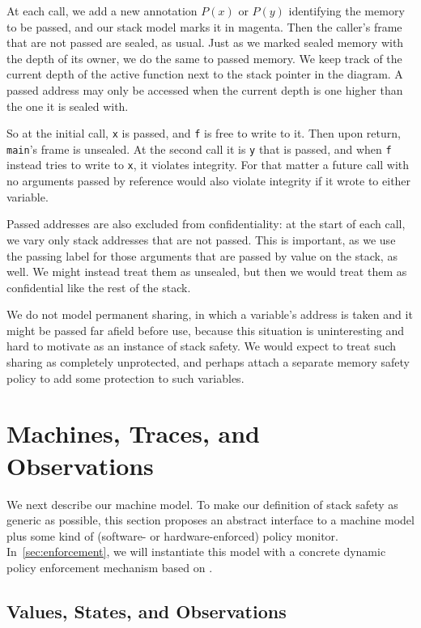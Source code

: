 \documentclass[acmsmall,review,anonymous]{acmart}\settopmatter{printfolios=true,printccs=false,printacmref=false}
\begin{document}
At each call, we add a new annotation \(P(x)\) or \(P(y)\) identifying the memory to be
passed, and our stack model marks it in magenta. Then the caller's frame that are not
passed are sealed, as usual. Just as we marked sealed memory with the depth of its owner,
we do the same to passed memory. We keep track of the current depth of the active function
next to the stack pointer in the diagram. A passed address may only be accessed when the
current depth is one higher than the one it is sealed with.

So at the initial call, {\tt x} is passed, and {\tt f} is free to write to it. Then upon
return, {\tt main}'s frame is unsealed. At the second call it is {\tt y} that is passed,
and when {\tt f} instead tries to write to {\tt x}, it violates integrity. For that matter
a future call with no arguments passed by reference would also violate integrity if it wrote
to either variable.

Passed addresses are also excluded from confidentiality: at the start of each call, we vary
only stack addresses that are not passed. This is important, as we use the passing label
for those arguments that are passed by value on the stack, as well. We might instead
treat them as unsealed, but then we would treat them as confidential like the rest of the stack.

We do not model permanent sharing, in which a variable's address is taken and it might be
passed far afield before use, because this situation is uninteresting and hard to motivate
as an instance of stack safety. We would expect to treat such sharing as completely
unprotected, and perhaps attach a separate memory safety policy to add some protection
to such variables.

\section{Machines, Traces, and Observations}
\label{sec:prelim}

We next describe our machine model. To make our definition of stack safety
as generic as possible, this section proposes an abstract interface to a
machine model plus some kind of (software- or hardware-enforced) policy monitor.
In~\cref{sec:enforcement}, we will instantiate this model with a concrete dynamic
policy enforcement mechanism based on \citet{DBLP:conf/sp/RoesslerD18}.

\subsection{Values, States, and Observations}
\end{document}
